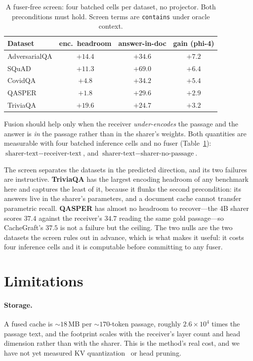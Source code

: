 \documentclass[sigconf,anonymous,review]{acmart}
\newcommand{\sys}{CacheGraft}
\begin{document}
\begin{table}[t]
\centering\small
\caption{A fuser-free screen: four batched cells per dataset, no projector. Both preconditions
must hold. Screen terms are \texttt{contains} under oracle context.}
\label{tab:screen}
\begin{tabular}{lccc}
\toprule
Dataset & enc.\ headroom & answer-in-doc & gain (phi-4) \\
\midrule
AdversarialQA & $+14.4$ & $+34.6$ & $+7.2$ \\
SQuAD & $+11.3$ & $+69.0$ & $+6.4$ \\
CovidQA & $+4.8$ & $+34.2$ & $+5.4$ \\
QASPER & $+1.8$ & $+29.6$ & $+2.9$ \\
TriviaQA & $+19.6$ & $+24.7$ & $+3.2$ \\
\bottomrule
\end{tabular}
\end{table}

Fusion should help only when the receiver \emph{under-encodes} the passage and the answer is
\emph{in} the passage rather than in the sharer's weights. Both quantities are measurable with
four batched inference cells and no fuser (Table~\ref{tab:screen}):
$\text{sharer-text} - \text{receiver-text}$, and $\text{sharer-text} - \text{sharer-no-passage}$.

The screen separates the datasets in the predicted direction, and its two failures are
instructive. \textbf{TriviaQA} has the largest encoding headroom of any benchmark here and
captures the least of it, because it flunks the second precondition: its answers live in the
sharer's parameters, and a document cache cannot transfer parametric recall. \textbf{QASPER} has
almost no headroom to recover---the 4B sharer scores $37.4$ against the receiver's $34.7$ reading
the same gold passage---so \sys{}'s $37.5$ is not a failure but the ceiling. The two nulls are
the two datasets the screen rules out in advance, which is what makes it useful: it costs four
inference cells and it is computable before committing to any fuser.

\section{Limitations}

\paragraph{Storage.} A fused cache is ${\sim}18$\,MB per ${\sim}170$-token passage, roughly
$2.6\times10^{4}$ times the passage text, and the footprint scales with the receiver's layer count
and head dimension rather than with the sharer. This is the method's real cost, and we have not
yet measured KV quantization~\cite{liu2024kivi} or head pruning.
\end{document}

